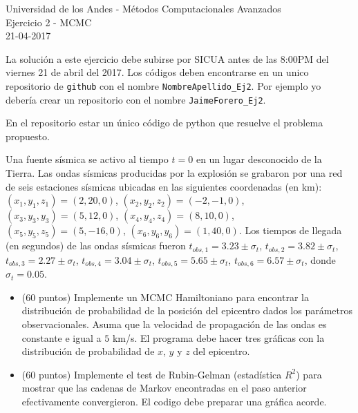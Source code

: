 \documentclass[11pt,letterpaper]{exam}
\begin{document}
\begin{center}
{\Large Universidad de los Andes - M\'etodos Computacionales Avanzados} \\
Ejercicio 2 - \textsc{MCMC}\\
21-04-2017\\
\end{center}



\vspace{0.3cm}


\noindent
La solución a este ejercicio debe subirse por SICUA antes de las 8:00PM
del viernes 21 de abril del 2017. 
Los c\'odigos deben encontrarse en un unico repositorio de \verb'github'
con el nombre \verb"NombreApellido_Ej2". Por ejemplo yo deber\'ia
crear un repositorio con el nombre
\verb"JaimeForero_Ej2". 

\noindent
En el repositorio estar un \'unico c\'odigo de python que
resuelve el problema propuesto.  

\vspace{0.3cm}

\begin{questions}
  Una fuente s\'ismica se activo al tiempo $t=0$ en un lugar
desconocido de la Tierra. Las ondas s\'ismicas
producidas por la explosi\'on se grabaron por una red de seis
estaciones s\'ismicas ubicadas en las siguientes coordenadas (en km):
$(x_1,y_1,z_1)=(2,20,0)$,
$(x_2,y_2,z_2)=(-2,-1,0)$,
$(x_3,y_3,y_3)=(5,12,0)$,
$(x_4,y_4,z_4)=(8,10,0)$,
$(x_5,y_5,z_5)=(5,-16,0)$,
$(x_6,y_6,y_6)=(1,40,0)$. Los 
tiempos de llegada (en segundos) de las ondas s\'ismicas fueron 
$t_{obs,1}=3.23\pm\sigma_t$, $t_{obs,2}=3.82\pm\sigma_t$,
$t_{obs,3}=2.27\pm\sigma_t$, $t_{obs,4}=3.04\pm\sigma_t$,
$t_{obs,5}=5.65\pm\sigma_t$, $t_{obs,6}=6.57\pm\sigma_t$, donde
$\sigma_t=0.05$. 
\begin{itemize}
\item (60 puntos) Implemente un MCMC Hamiltoniano
  para encontrar la distribuci\'on de probabilidad de la posici\'on del
  epicentro dados los par\'ametros observacionales. Asuma que la
  velocidad de propagaci\'on de las 
  ondas es constante e igual a $5$ km/s.
  El programa debe hacer tres gr\'aficas con la distribuci\'on de
  probabilidad de $x$, $y$ y $z$ del epicentro.
\item (60 puntos) Implemente el test de Rubin-Gelman (estad\'istica
  $R^2$) para mostrar que las cadenas de Markov encontradas en el paso
  anterior efectivamente convergieron. El codigo debe preparar una
  gr\'afica acorde.
\end{itemize}

\end{questions}
\end{document}
